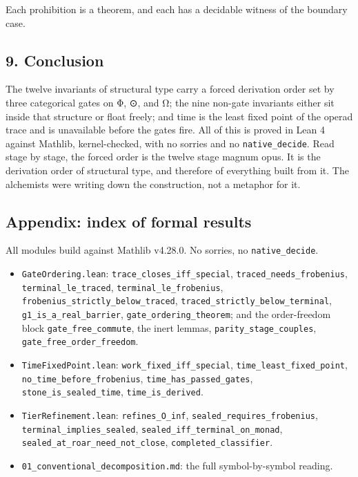 Each prohibition is a theorem, and each has a decidable witness of the
boundary case.

\hypertarget{conclusion}{%
\subsection{9. Conclusion}\label{conclusion}}

The twelve invariants of structural type carry a forced derivation order
set by three categorical gates on Φ, ⊙, and Ω; the nine non-gate
invariants either sit inside that structure or float freely; and time is
the least fixed point of the operad trace and is unavailable before the
gates fire. All of this is proved in Lean 4 against Mathlib,
kernel-checked, with no sorries and no \texttt{native\_decide}. Read
stage by stage, the forced order is the twelve stage magnum opus. It is
the derivation order of structural type, and therefore of everything
built from it. The alchemists were writing down the construction, not a
metaphor for it.

\hypertarget{appendix-index-of-formal-results}{%
\subsection{Appendix: index of formal
results}\label{appendix-index-of-formal-results}}

All modules build against Mathlib v4.28.0. No sorries, no
\texttt{native\_decide}.

\begin{itemize}
\tightlist
\item
  \texttt{GateOrdering.lean}: \texttt{trace\_closes\_iff\_special},
  \texttt{traced\_needs\_frobenius}, \texttt{terminal\_le\_traced},
  \texttt{terminal\_le\_frobenius},
  \texttt{frobenius\_strictly\_below\_traced},
  \texttt{traced\_strictly\_below\_terminal},
  \texttt{g1\_is\_a\_real\_barrier}, \texttt{gate\_ordering\_theorem};
  and the order-freedom block \texttt{gate\_free\_commute}, the inert
  lemmas, \texttt{parity\_stage\_couples},
  \texttt{gate\_free\_order\_freedom}.
\item
  \texttt{TimeFixedPoint.lean}: \texttt{work\_fixed\_iff\_special},
  \texttt{time\_least\_fixed\_point},
  \texttt{no\_time\_before\_frobenius},
  \texttt{time\_has\_passed\_gates}, \texttt{stone\_is\_sealed\_time},
  \texttt{time\_is\_derived}.
\item
  \texttt{TierRefinement.lean}: \texttt{refines\_O\_inf},
  \texttt{sealed\_requires\_frobenius},
  \texttt{terminal\_implies\_sealed},
  \texttt{sealed\_iff\_terminal\_on\_monad},
  \texttt{sealed\_at\_roar\_need\_not\_close},
  \texttt{completed\_classifier}.
\item
  \texttt{01\_conventional\_decomposition.md}: the full symbol-by-symbol
  reading.
\end{itemize}
